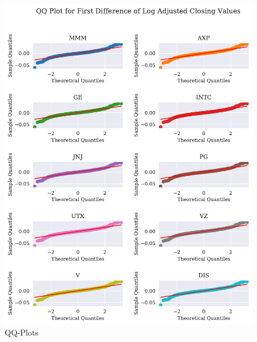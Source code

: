 \begin{figure}[h]
    \centering
    \begin{adjustbox}{width=.9\textwidth,center}
    \includegraphics[]{figures/all_qq_plot_fd_log_adjclose.pdf}
    \end{adjustbox}  
    \caption{QQ-Plots}
    \label{fig:all_qq_fd_log_adjclose}
\end{figure}{}











\begin{table}[h]
    \centering
    
    \caption{}
    \label{tab:V_AR1_log_returns}
\end{table}{}


